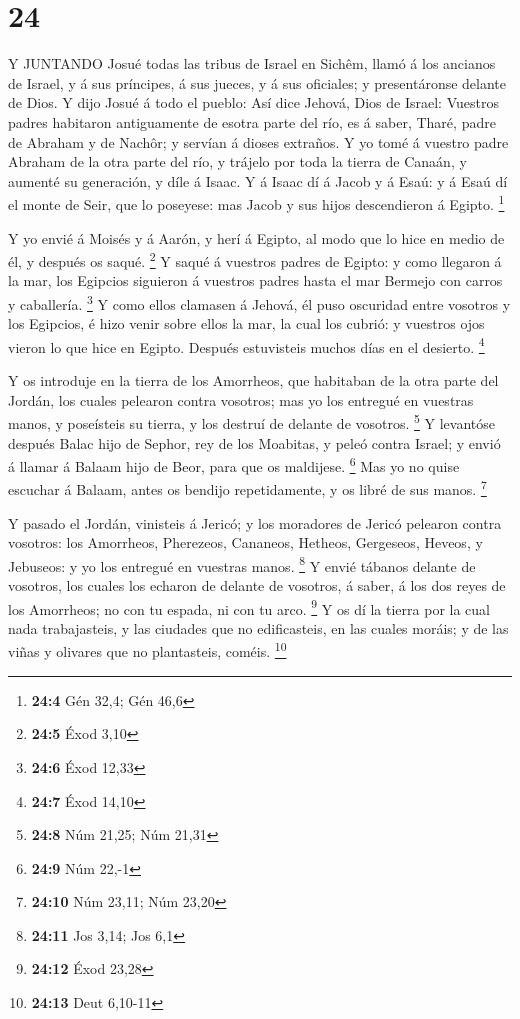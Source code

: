 \hypertarget{section-23}{%
\section{24}\label{section-23}}

 Y JUNTANDO Josué todas las tribus de Israel en Sichêm,
llamó á los ancianos de Israel, y á sus príncipes, á sus jueces, y á sus
oficiales; y presentáronse delante de Dios.  Y dijo Josué á
todo el pueblo: Así dice Jehová, Dios de Israel: Vuestros padres
habitaron antiguamente de esotra parte del río, es á saber, Tharé, padre
de Abraham y de Nachôr; y servían á dioses extraños.  Y yo
tomé á vuestro padre Abraham de la otra parte del río, y trájelo por
toda la tierra de Canaán, y aumenté su generación, y díle á Isaac.
 Y á Isaac dí á Jacob y á Esaú: y á Esaú dí el monte de
Seir, que lo poseyese: mas Jacob y sus hijos descendieron á Egipto.
\footnote{\textbf{24:4} Gén 32,4; Gén 46,6}

 Y yo envié á Moisés y á Aarón, y herí á Egipto, al modo que
lo hice en medio de él, y después os saqué. \footnote{\textbf{24:5} Éxod
  3,10}  Y saqué á vuestros padres de Egipto: y como
llegaron á la mar, los Egipcios siguieron á vuestros padres hasta el mar
Bermejo con carros y caballería. \footnote{\textbf{24:6} Éxod 12,33}
 Y como ellos clamasen á Jehová, él puso oscuridad entre
vosotros y los Egipcios, é hizo venir sobre ellos la mar, la cual los
cubrió: y vuestros ojos vieron lo que hice en Egipto. Después
estuvisteis muchos días en el desierto. \footnote{\textbf{24:7} Éxod
  14,10}

 Y os introduje en la tierra de los Amorrheos, que habitaban
de la otra parte del Jordán, los cuales pelearon contra vosotros; mas yo
los entregué en vuestras manos, y poseísteis su tierra, y los destruí de
delante de vosotros. \footnote{\textbf{24:8} Núm 21,25; Núm 21,31}
 Y levantóse después Balac hijo de Sephor, rey de los
Moabitas, y peleó contra Israel; y envió á llamar á Balaam hijo de Beor,
para que os maldijese. \footnote{\textbf{24:9} Núm 22,-1} 
Mas yo no quise escuchar á Balaam, antes os bendijo repetidamente, y os
libré de sus manos. \footnote{\textbf{24:10} Núm 23,11; Núm 23,20}

 Y pasado el Jordán, vinisteis á Jericó; y los moradores de
Jericó pelearon contra vosotros: los Amorrheos, Pherezeos, Cananeos,
Hetheos, Gergeseos, Heveos, y Jebuseos: y yo los entregué en vuestras
manos. \footnote{\textbf{24:11} Jos 3,14; Jos 6,1}  Y envié
tábanos delante de vosotros, los cuales los echaron de delante de
vosotros, á saber, á los dos reyes de los Amorrheos; no con tu espada,
ni con tu arco. \footnote{\textbf{24:12} Éxod 23,28}  Y os
dí la tierra por la cual nada trabajasteis, y las ciudades que no
edificasteis, en las cuales moráis; y de las viñas y olivares que no
plantasteis, coméis. \footnote{\textbf{24:13} Deut 6,10-11}

